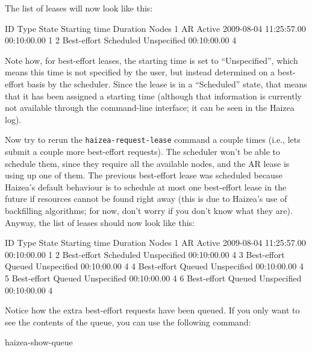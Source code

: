 The list of leases will now look like this:

\begin{wideshellverbatim}
 ID   Type          State      Starting time           Duration      Nodes  
 1    AR            Active     2009-08-04 11:25:57.00  00:10:00.00   1       
 2    Best-effort   Scheduled  Unspecified             00:10:00.00   4       
\end{wideshellverbatim}

Note how, for best-effort leases, the starting time is set to ``Unspecified'', which means this time is not specified by the user, but instead determined on a best-effort basis by the scheduler. Since the lease is in a ``Scheduled'' state, that means that it has been assigned a starting time (although that information is currently not available through the command-line interface; it can be seen in the Haizea log).

Now try to rerun the \texttt{haizea-request-lease} command a couple times (i.e., lets submit a couple more best-effort requests). The scheduler won't be able to schedule them, since they require all the available nodes, and the AR lease is using up one of them. The previous best-effort lease was scheduled because Haizea's default behaviour is to schedule at most one best-effort lease in the future if resources cannot be found right away (this is due to Haizea's use of backfilling algorithms; for now, don't worry if you don't know what they are). Anyway, the list of leases should now look like this:

\begin{wideshellverbatim}
 ID   Type  State      Starting time           Duration      Nodes  
 1    AR            Active     2009-08-04 11:25:57.00  00:10:00.00   1       
 2    Best-effort   Scheduled  Unspecified             00:10:00.00   4       
 3    Best-effort   Queued     Unspecified             00:10:00.00   4       
 4    Best-effort   Queued     Unspecified             00:10:00.00   4       
 5    Best-effort   Queued     Unspecified             00:10:00.00   4       
 6    Best-effort   Queued     Unspecified             00:10:00.00   4       
\end{wideshellverbatim}

Notice how the extra best-effort requests have been queued. If you only want to see the contents of the queue, you can use the following command:

\begin{shellverbatim}
haizea-show-queue
\end{shellverbatim}

